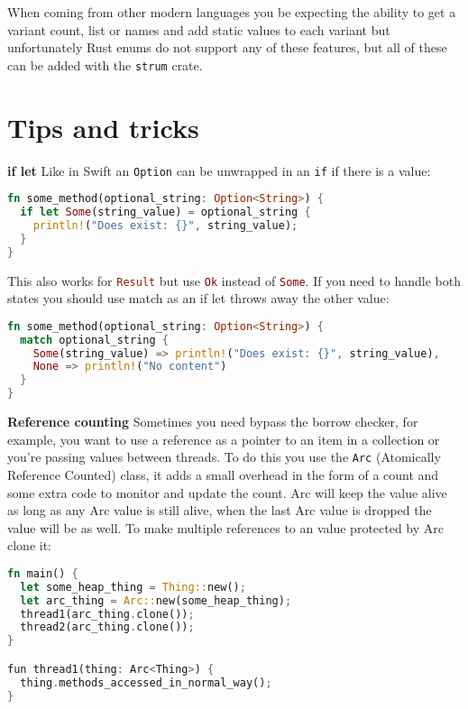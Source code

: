 \documentclass[a4paper,11pt]{article}
\begin{document}
When coming from other modern languages you be expecting the ability to get a variant count, list or names and add static values to each variant but unfortunately Rust enums do not support any of these features, but all of these can be added with the \lstinline{strum} crate. 

\newpage
\section{Tips and tricks}
\medskip
\textbf{if let}
\newline
Like in Swift an \lstinline[language=Kotlin]{Option} can be unwrapped in an \lstinline|if| if there is a value:

\begin{lstlisting}[language=Rust,frame=single]
fn some_method(optional_string: Option<String>) {
  if let Some(string_value) = optional_string {
    println!("Does exist: {}", string_value);
  }
}
\end{lstlisting}

This also works for \lstinline[language=Rust]{Result} but use \lstinline[language=Rust]{Ok} instead of \lstinline[language=Rust]{Some}. If you need to handle both states you should use match as an if let throws away the other value:
\begin{lstlisting}[language=Rust,frame=single]
fn some_method(optional_string: Option<String>) {
  match optional_string {
    Some(string_value) => println!("Does exist: {}", string_value),
    None => println!("No content")
  }
}
\end{lstlisting}
\medskip
\medskip
\textbf{Reference counting}
\newline
Sometimes you need bypass the borrow checker, for example, you want to use a reference as a pointer to an item in a collection or you're passing values between threads. To do this you use the \lstinline[language=Rust]{Arc} (Atomically Reference Counted) class, it adds a small overhead in the form of a count and some extra code to monitor and update the count. Arc will keep the value alive as long as any Arc value is still alive, when the last Arc value is dropped the value will be as well. To make multiple references to an value protected by Arc clone it:
\begin{lstlisting}[language=Rust,frame=single]
fn main() {
  let some_heap_thing = Thing::new();
  let arc_thing = Arc::new(some_heap_thing);
  thread1(arc_thing.clone()); 
  thread2(arc_thing.clone()); 
}

fun thread1(thing: Arc<Thing>) {
  thing.methods_accessed_in_normal_way();
}
\end{lstlisting}
\end{document}
